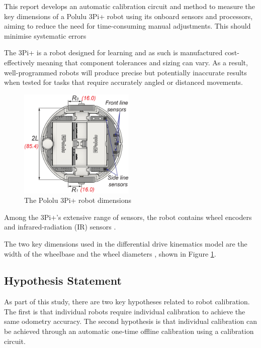 \documentclass[conference]{IEEEtran}
\begin{document}
This report develops an automatic calibration circuit and method to measure the key dimensions of a Polulu 3Pi+ robot using its onboard sensors and processors, aiming to reduce the need for time-consuming manual adjustments. This should minimise systematic errors \cite{odometry} 

The 3Pi+ is a robot designed for learning and as such is manufactured cost-effectively meaning that component tolerances and sizing can vary. As a result, well-programmed robots will produce precise but potentially inaccurate results when tested for tasks that require accurately angled or distanced movements. 

\begin{figure}[h!]
    \centering
    \includegraphics[width = 0.49\textwidth]{img/robot_schemtatic.png}
    \caption{The Pololu 3Pi+ robot dimensions}
    \label{fig:dimensions}
\end{figure}

Among the 3Pi+'s extensive range of sensors, the robot contains wheel encoders and infrared-radiation (IR) sensors \cite{pololu_guide}. 

The two key dimensions used in the differential drive kinematics model are the width of the wheelbase and the wheel diameters \cite{pololu_guide}, shown in Figure \ref{fig:dimensions}.


\subsection{Hypothesis Statement}

As part of this study, there are two key hypotheses related to robot calibration. The first is that individual robots require individual calibration to achieve the same odometry accuracy. The second hypothesis is that individual calibration can be achieved through an automatic one-time offline calibration using a calibration circuit.
\end{document}
